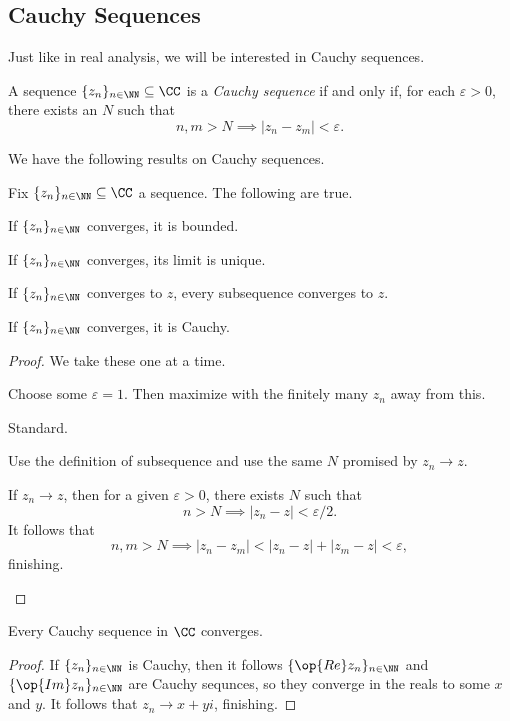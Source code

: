 \subsection{Cauchy Sequences}
Just like in real analysis, we will be interested in Cauchy sequences.
\begin{definition}
	A sequence $\{z_n\}_{n\in\NN}\subseteq\CC$ is a \textit{Cauchy sequence} if and only if, for each $\varepsilon>0$, there exists an $N$ such that
	\[n,m>N\implies|z_n-z_m|<\varepsilon.\]
\end{definition}
We have the following results on Cauchy sequences.
\begin{proposition}
	Fix $\{z_n\}_{n\in\NN}\subseteq\CC$ a sequence. The following are true.
	\begin{listalph}
		\item If $\{z_n\}_{n\in\NN}$ converges, it is bounded.
		\item If $\{z_n\}_{n\in\NN}$ converges, its limit is unique.
		\item If $\{z_n\}_{n\in\NN}$ converges to $z$, every subsequence converges to $z$.
		\item If $\{z_n\}_{n\in\NN}$ converges, it is Cauchy.
	\end{listalph}
\end{proposition}
\begin{proof}
	We take these one at a time.
	\begin{listalph}
		\item Choose some $\varepsilon=1$. Then maximize with the finitely many $z_n$ away from this.
		\item Standard.\todo{}
		\item Use the definition of subsequence and use the same $N$ promised by $z_n\to z$.
		\item If $z_n\to z$, then for a given $\varepsilon>0$, there exists $N$ such that
		\[n>N\implies|z_n-z|<\varepsilon/2.\]
		It follows that
		\[n,m>N\implies|z_n-z_m|<|z_n-z|+|z_m-z|<\varepsilon,\]
		finishing.
		\qedhere
	\end{listalph}
\end{proof}
\begin{proposition}
	Every Cauchy sequence in $\CC$ converges.
\end{proposition}
\begin{proof}
	If $\{z_n\}_{n\in\NN}$ is Cauchy, then it follows $\{\op{Re}z_n\}_{n\in\NN}$ and $\{\op{Im}z_n\}_{n\in\NN}$ are Cauchy sequnces, so they converge in the reals to some $x$ and $y$. It follows that $z_n\to x+yi$, finishing.
\end{proof}

